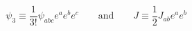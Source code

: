 \begin{equation}
\psi_3 \equiv \frac{1}{3!} \psi_{abc} e^a e^b e^c \qquad \mbox{and}
\qquad 
J \equiv  \frac{1}{2} J_{ab} e^a e^b 
\end{equation}

